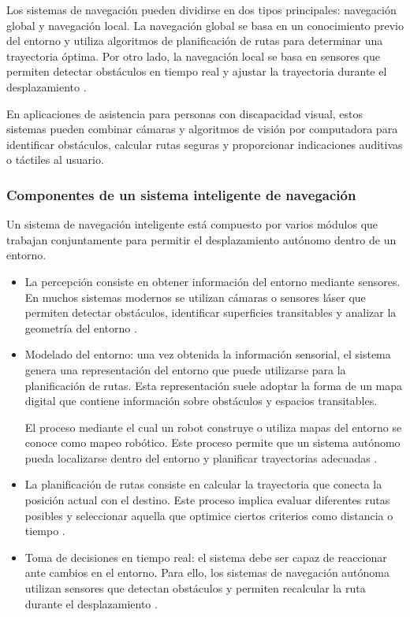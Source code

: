 Los sistemas de navegación pueden dividirse en dos tipos principales: navegación global y navegación local. La navegación global se basa en un conocimiento previo del entorno y utiliza algoritmos de planificación de rutas para determinar una trayectoria óptima. Por otro lado, la navegación local se basa en sensores que permiten detectar obstáculos en tiempo real y ajustar la trayectoria durante el desplazamiento \cite{fox1997dynamic}.

En aplicaciones de asistencia para personas con discapacidad visual, estos sistemas pueden combinar cámaras y algoritmos de visión por computadora para identificar obstáculos, calcular rutas seguras y proporcionar indicaciones auditivas o táctiles al usuario.

\subsubsection{Componentes de un sistema inteligente de navegación}

Un sistema de navegación inteligente está compuesto por varios módulos que trabajan conjuntamente para permitir el desplazamiento autónomo dentro de un entorno.

\begin{itemize}
    \item La percepción consiste en obtener información del entorno mediante sensores. En muchos sistemas modernos se utilizan cámaras o sensores láser que permiten detectar obstáculos, identificar superficies transitables y analizar la geometría del entorno \cite{thrun2005probabilistic}.

    \item Modelado del entorno: una vez obtenida la información sensorial, el sistema genera una representación del entorno que puede utilizarse para la planificación de rutas. Esta representación suele adoptar la forma de un mapa digital que contiene información sobre obstáculos y espacios transitables.

    El proceso mediante el cual un robot construye o utiliza mapas del entorno se conoce como mapeo robótico. Este proceso permite que un sistema autónomo pueda localizarse dentro del entorno y planificar trayectorias adecuadas \cite{elfes1989nav}.

    \item La planificación de rutas consiste en calcular la trayectoria que conecta la posición actual con el destino. Este proceso implica evaluar diferentes rutas posibles y seleccionar aquella que optimice ciertos criterios como distancia o tiempo \cite{lavalle2006planning}.

    \item Toma de decisiones en tiempo real: el sistema debe ser capaz de reaccionar ante cambios en el entorno. Para ello, los sistemas de navegación autónoma utilizan sensores que detectan obstáculos y permiten recalcular la ruta durante el desplazamiento \cite{fox1997dynamic}.
\end{itemize}

